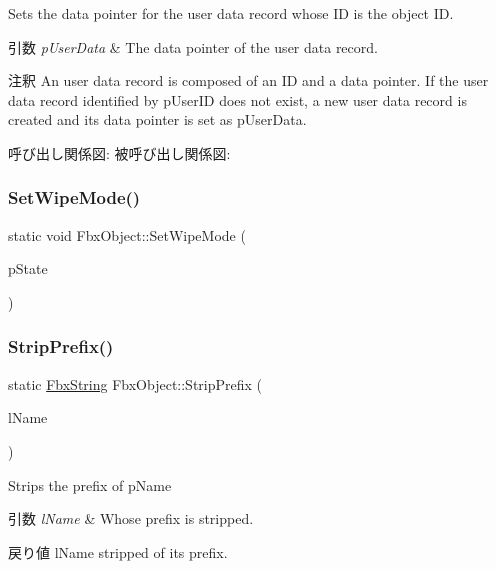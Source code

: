 Sets the data pointer for the user data record whose ID is the object ID. 
\begin{DoxyParams}{引数}
{\em p\+User\+Data} & The data pointer of the user data record. \\
\hline
\end{DoxyParams}
\begin{DoxyRemark}{注釈}
An user data record is composed of an ID and a data pointer. If the user data record identified by p\+User\+ID does not exist, a new user data record is created and its data pointer is set as p\+User\+Data. 
\end{DoxyRemark}
呼び出し関係図\+:
被呼び出し関係図\+:
\mbox{\label{class_fbx_object_adbd35588cd04556b1a7fc5ffdee8b417}} 
\subsubsection{\texorpdfstring{Set\+Wipe\+Mode()}{SetWipeMode()}}
{\footnotesize\ttfamily static void Fbx\+Object\+::\+Set\+Wipe\+Mode (\begin{DoxyParamCaption}\item[{bool}]{p\+State }\end{DoxyParamCaption})\hspace{0.3cm}{\ttfamily [static]}}

\mbox{\label{class_fbx_object_aef0a016a9b53593f537b68ba47b8dd6e}} 
\subsubsection{\texorpdfstring{Strip\+Prefix()}{StripPrefix()}\hspace{0.1cm}{\footnotesize\ttfamily [1/2]}}
{\footnotesize\ttfamily static \hyperlink{class_fbx_string}{Fbx\+String} Fbx\+Object\+::\+Strip\+Prefix (\begin{DoxyParamCaption}\item[{\hyperlink{class_fbx_string}{Fbx\+String} \&}]{l\+Name }\end{DoxyParamCaption})\hspace{0.3cm}{\ttfamily [static]}}

Strips the prefix of p\+Name 
\begin{DoxyParams}{引数}
{\em l\+Name} & Whose prefix is stripped. \\
\hline
\end{DoxyParams}
\begin{DoxyReturn}{戻り値}
l\+Name stripped of its prefix. 
\end{DoxyReturn}
\mbox{\label{class_fbx_object_a23b53eecb8b6b7d198496392dc987548}} 
